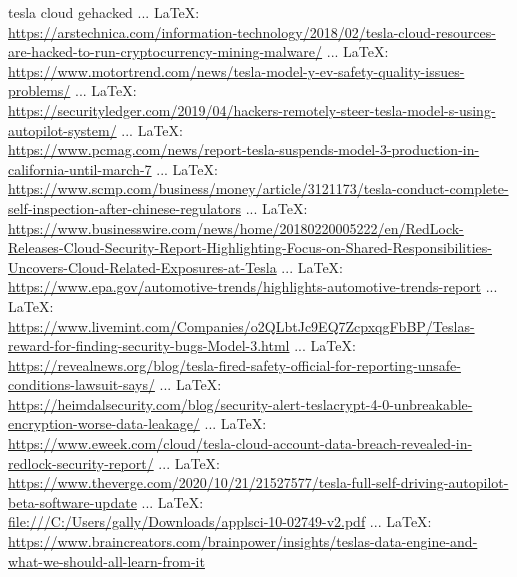 \begin{thebibliography}{99}
{{{{				
				tesla cloud gehacked
				 ... \LaTeX:\\ \url{https://arstechnica.com/information-technology/2018/02/tesla-cloud-resources-are-hacked-to-run-cryptocurrency-mining-malware/}
				 ... \LaTeX:\\ \url{https://www.motortrend.com/news/tesla-model-y-ev-safety-quality-issues-problems/}
				 ... \LaTeX:\\ \url{https://securityledger.com/2019/04/hackers-remotely-steer-tesla-model-s-using-autopilot-system/}
				 ... \LaTeX:\\ \url{https://www.pcmag.com/news/report-tesla-suspends-model-3-production-in-california-until-march-7}
				 ... \LaTeX:\\ \url{https://www.scmp.com/business/money/article/3121173/tesla-conduct-complete-self-inspection-after-chinese-regulators}
				 ... \LaTeX:\\ \url{https://www.businesswire.com/news/home/20180220005222/en/RedLock-Releases-Cloud-Security-Report-Highlighting-Focus-on-Shared-Responsibilities-Uncovers-Cloud-Related-Exposures-at-Tesla}
				 ... \LaTeX:\\ \url{https://www.epa.gov/automotive-trends/highlights-automotive-trends-report}
				 ... \LaTeX:\\ \url{https://www.livemint.com/Companies/o2QLbtJc9EQ7ZcpxqgFbBP/Teslas-reward-for-finding-security-bugs-Model-3.html}
				 ... \LaTeX:\\ \url{https://revealnews.org/blog/tesla-fired-safety-official-for-reporting-unsafe-conditions-lawsuit-says/}
				 ... \LaTeX:\\ \url{https://heimdalsecurity.com/blog/security-alert-teslacrypt-4-0-unbreakable-encryption-worse-data-leakage/}
				 ... \LaTeX:\\ \url{https://www.eweek.com/cloud/tesla-cloud-account-data-breach-revealed-in-redlock-security-report/}
				 ... \LaTeX:\\ \url{https://www.theverge.com/2020/10/21/21527577/tesla-full-self-driving-autopilot-beta-software-update}
				 ... \LaTeX:\\ \url{file:///C:/Users/gally/Downloads/applsci-10-02749-v2.pdf}
				 ... \LaTeX:\\ \url{https://www.braincreators.com/brainpower/insights/teslas-data-engine-and-what-we-should-all-learn-from-it}
}}}}
\end{thebibliography}
